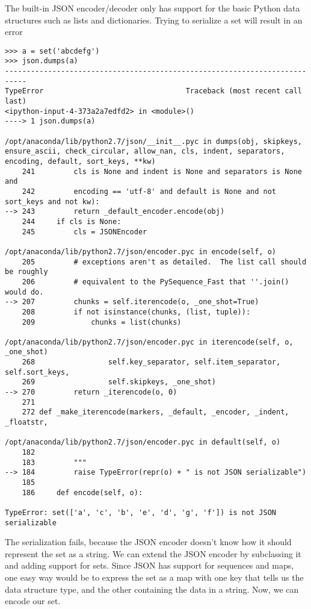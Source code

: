 The built-in JSON encoder/decoder only has support for the basic Python data structures such as lists and dictionaries.
Trying to serialize a set will result in an error
\begin{lstlisting}
>>> a = set('abcdefg')
>>> json.dumps(a)
---------------------------------------------------------------------------
TypeError                                 Traceback (most recent call last)
<ipython-input-4-373a2a7edfd2> in <module>()
----> 1 json.dumps(a)

/opt/anaconda/lib/python2.7/json/__init__.pyc in dumps(obj, skipkeys, ensure_ascii, check_circular, allow_nan, cls, indent, separators, encoding, default, sort_keys, **kw)
    241         cls is None and indent is None and separators is None and
    242         encoding == 'utf-8' and default is None and not sort_keys and not kw):
--> 243         return _default_encoder.encode(obj)
    244     if cls is None:
    245         cls = JSONEncoder

/opt/anaconda/lib/python2.7/json/encoder.pyc in encode(self, o)
    205         # exceptions aren't as detailed.  The list call should be roughly
    206         # equivalent to the PySequence_Fast that ''.join() would do.
--> 207         chunks = self.iterencode(o, _one_shot=True)
    208         if not isinstance(chunks, (list, tuple)):
    209             chunks = list(chunks)

/opt/anaconda/lib/python2.7/json/encoder.pyc in iterencode(self, o, _one_shot)
    268                 self.key_separator, self.item_separator, self.sort_keys,
    269                 self.skipkeys, _one_shot)
--> 270         return _iterencode(o, 0)
    271 
    272 def _make_iterencode(markers, _default, _encoder, _indent, _floatstr,

/opt/anaconda/lib/python2.7/json/encoder.pyc in default(self, o)
    182 
    183         """
--> 184         raise TypeError(repr(o) + " is not JSON serializable")
    185 
    186     def encode(self, o):

TypeError: set(['a', 'c', 'b', 'e', 'd', 'g', 'f']) is not JSON serializable
\end{lstlisting}
The serialization fails, because the JSON encoder doesn't know how it should represent the set as a string.
We can extend the JSON encoder by subclassing it and adding support for sets.
Since JSON has support for sequences and maps, one easy way would be to express the set as a map with one key that tells us the data structure type, and the other containing the data in a string.
Now, we can encode our set.
